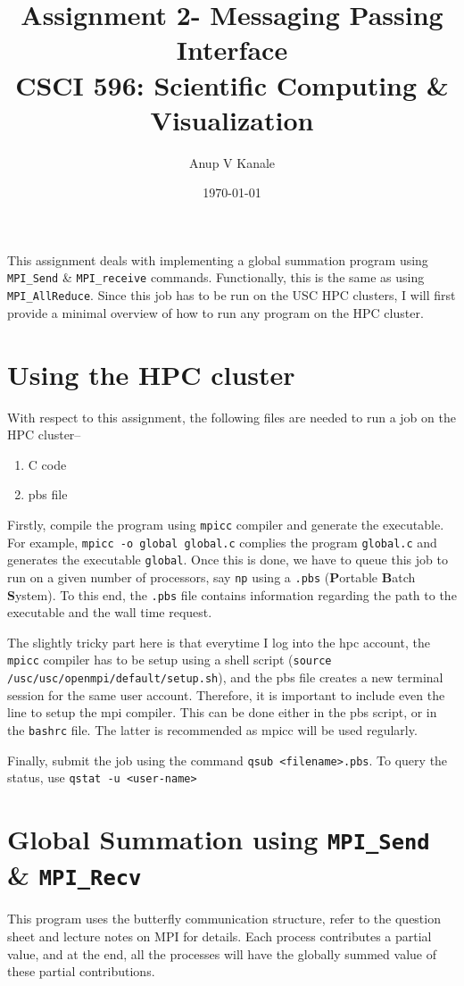 \documentclass[11pt, oneside]{article}   	%
\title{\vspace{-6ex} Assignment 2- Messaging Passing Interface \\ {CSCI 596: Scientific Computing \& Visualization}  \vspace{-2ex}}
\author{Anup V Kanale}
\date{\vspace{-2ex}\today}							%
\begin{document}
\maketitle \vspace{-5ex}

This assignment deals with implementing a global summation program using \texttt{MPI\_Send} \& \texttt{MPI\_receive} commands. Functionally, this is the same as using \texttt{MPI\_AllReduce}.
Since this job has to be run on the USC HPC clusters, I will first provide a minimal overview of how to run any program on the HPC cluster.
\vspace{-2ex} \section{Using the HPC cluster}
With respect to this assignment, the following files are needed to run a job on the HPC cluster--
\begin{enumerate}
	\item C code
	\item pbs file
\end{enumerate}
Firstly, compile the program using \texttt{mpicc} compiler and generate the executable. For example, \texttt{mpicc -o global global.c} complies the program \texttt{global.c} and generates the executable \texttt{global}. Once this is done, we have to queue this job to run on a given number of processors, say \texttt{np} using a \texttt{.pbs} (\textbf{P}ortable \textbf{B}atch \textbf{S}ystem). To this end, the \texttt{.pbs} file contains information regarding the path to the executable and the wall time request. 

The slightly tricky part here is that everytime I log into the hpc account, the \texttt{mpicc} compiler has to be setup using a shell script (\texttt{source /usc/usc/openmpi/default/setup.sh}), and the pbs file creates a new terminal session for the same user account. Therefore, it is important to include even the line to setup the mpi compiler. This can be done either in the pbs script, or in the \texttt{bashrc} file. The latter is recommended as mpicc will be used regularly.

Finally, submit the job using the command \texttt{qsub <filename>.pbs}. To query the status, use \texttt{qstat -u <user-name>}

\section{Global Summation using \texttt{MPI\_Send} \& \texttt{MPI\_Recv}}
This program uses the butterfly communication structure, refer to the question sheet and lecture notes on MPI for details. Each process contributes a partial value, and at the end, all the processes will have the globally summed value of these partial contributions.
\end{document}
